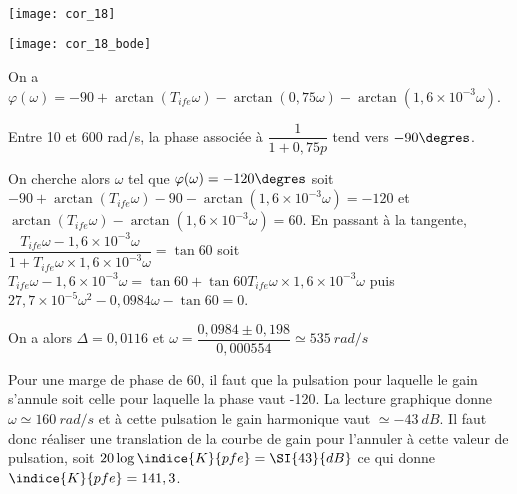 \question{}
\ifprof
\begin{corrige}~\\
\begin{center}
\texttt{[image: cor\_18]}
\end{center}

\begin{center}
\texttt{[image: cor\_18\_bode]}
\end{center}
\end{corrige}
\else
\fi


\question{}
\ifprof
\begin{corrige}
On a $\varphi(\omega)=-90 +\arctan \left( T_{ife} \omega \right)-\arctan \left( 0,75 \omega \right)-\arctan \left( 1,6\times 10^{-3} \omega \right)$.

Entre 10 et 600 \si{rad/s}, la phase associée à $\dfrac{1}{1+0,75p}$ tend vers $-90\degres$.

On cherche alors $\omega$ tel que $\varphi(\omega) = -120\degres$ soit 
$-90 +\arctan \left( T_{ife} \omega \right)-90-\arctan \left( 1,6\times 10^{-3} \omega \right) = -120 $ et  
$\arctan \left( T_{ife} \omega \right)-\arctan \left( 1,6\times 10^{-3} \omega \right) = 60 $.
En passant à la tangente,
$ \dfrac{ T_{ife} \omega - 1,6\times 10^{-3} \omega }{1+ T_{ife} \omega \times 1,6\times 10^{-3} \omega } = \tan 60$
soit 
$  T_{ife} \omega - 1,6\times 10^{-3} \omega = \tan 60+ \tan 60 T_{ife} \omega \times 1,6\times 10^{-3} \omega $
puis
$    27,7\times 10^{-5} \omega^2 -  0,0984 \omega  - \tan 60 = 0$.


On a alors $\Delta= 0,0116$ et $\omega = \dfrac{0,0984\pm 0,198}{0,000554}\simeq \SI{535}{rad/s}$

\end{corrige}
\else
\fi


\question{}
\ifprof
\begin{corrige}
Pour une marge de phase de 60\degres, il faut que la pulsation pour laquelle le gain s'annule soit celle 
pour laquelle la phase vaut -120\degres. La lecture graphique donne $\omega \simeq \SI{160}{rad/s}$
 et à cette 
pulsation le gain harmonique vaut $\simeq -\SI{43}{dB}$. Il faut donc réaliser une translation de la courbe 
de gain pour l'annuler à cette valeur de pulsation, soit $20\log \indice{K}{pfe}=\SI{43}{dB}$ ce qui donne
$\indice{K}{pfe}=141,3$.
\end{corrige}
\else
\fi


